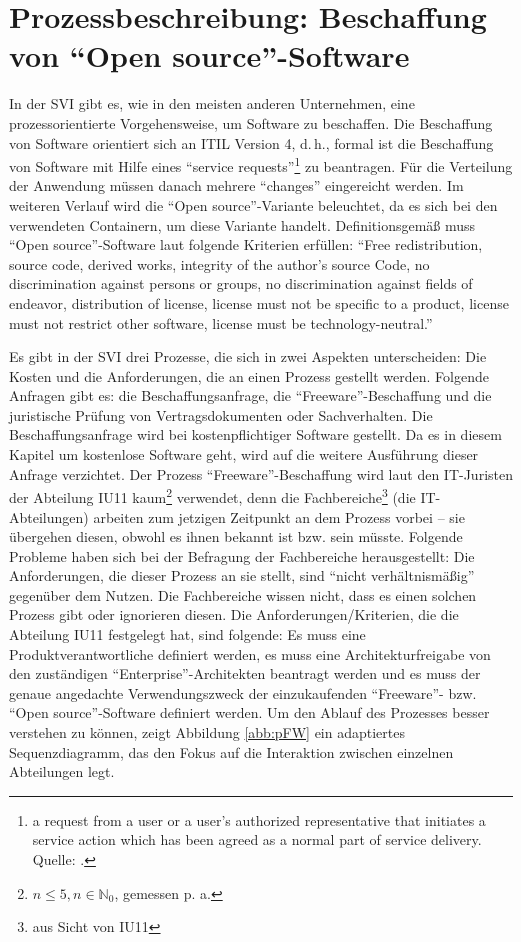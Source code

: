 \section{Prozessbeschreibung: Beschaffung von \enquote{Open source}-Software}
In der \ac{SVI} gibt es, wie in den meisten anderen Unternehmen, eine prozessorientierte Vorgehensweise, um Software zu beschaffen. Die Beschaffung von Software orientiert sich an \ac{ITIL} Version 4, d.\,h., formal ist die Beschaffung von Software mit Hilfe eines \enquote{service requests}\footnote{a request from a user or a user's authorized representative that initiates a service action which has been agreed as a normal part of service delivery. Quelle: \cite[][S.\,195]{axelos_limited_itil_2019}.} zu beantragen. Für die Verteilung der Anwendung müssen danach mehrere \enquote{changes} eingereicht werden. Im weiteren Verlauf wird die \enquote{Open source}-Variante beleuchtet, da es sich bei den verwendeten Containern, um diese Variante handelt. Definitionsgemäß muss \enquote{Open source}-Software laut \cite{opensourceorg_open_2020} folgende Kriterien erfüllen: \enquote{Free redistribution, source code, derived works, integrity of the author's source Code, no discrimination against persons or groups, no discrimination against fields of endeavor, distribution of license, license must not be specific to a product, license must not restrict other software, license must be technology-neutral.} 
\par
Es gibt in der \ac{SVI} drei Prozesse, die sich in zwei Aspekten unterscheiden: Die Kosten und die Anforderungen, die an einen Prozess gestellt werden. Folgende Anfragen gibt es: die Beschaffungsanfrage, die \enquote{Freeware}-Beschaffung und die juristische Prüfung von Vertragsdokumenten oder Sachverhalten. Die Beschaffungsanfrage wird bei kostenpflichtiger Software gestellt. Da es in diesem Kapitel um kostenlose Software geht, wird auf die weitere Ausführung dieser Anfrage verzichtet. Der Prozess \enquote{Freeware}-Beschaffung wird laut den IT-Juristen der Abteilung \ac{IU11} kaum\footnote{$ n \leq 5, n \in \mathbb{N}_{0} $, gemessen p. a.} verwendet, denn die Fachbereiche\footnote{aus Sicht von \ac{IU11}} (die IT-Abteilungen) arbeiten zum jetzigen Zeitpunkt an dem Prozess vorbei -- sie übergehen diesen, obwohl es ihnen bekannt ist bzw. sein müsste. Folgende Probleme haben sich bei der Befragung der Fachbereiche herausgestellt: Die Anforderungen, die dieser Prozess an sie stellt, sind \enquote{nicht verhältnismäßig} gegenüber dem Nutzen. Die Fachbereiche wissen nicht, dass es einen solchen Prozess gibt oder ignorieren diesen. Die Anforderungen/Kriterien, die die Abteilung \ac{IU11} festgelegt hat, sind folgende: Es muss eine Produktverantwortliche definiert werden, es muss eine Architekturfreigabe von den zuständigen \enquote{Enterprise}-Architekten beantragt werden und es muss der genaue angedachte Verwendungszweck der einzukaufenden \enquote{Freeware}- bzw. \enquote{Open source}-Software definiert werden. Um den Ablauf des Prozesses besser verstehen zu können, zeigt Abbildung \vref{abb:pFW} ein adaptiertes Sequenzdiagramm, das den Fokus auf die Interaktion zwischen einzelnen Abteilungen legt.

